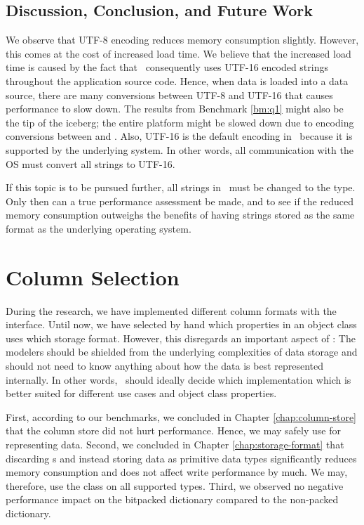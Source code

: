 \subsection{Discussion, Conclusion, and Future Work}
\label{sub:Discussion, Conclusion, and Future Work}
We observe that UTF-8 encoding reduces memory consumption slightly. However, this comes at the cost of increased load time. We believe that the increased load time is caused by the fact that \gap~consequently uses UTF-16 encoded strings throughout the application source code. Hence, when data is loaded into a data source, there are many conversions between UTF-8 and UTF-16 that causes performance to slow down. The results from Benchmark \ref{bm:q1} might also be the tip of the iceberg; the entire platform might be slowed down due to encoding conversions between  and . Also, UTF-16 is the default encoding in \delphi~because it is supported by the underlying system. In other words, all communication with the OS must convert all strings to UTF-16. 

If this topic is to be pursued further, all strings in \gap~must be changed to the  type. Only then can a true performance assessment be made, and to see if the reduced memory consumption outweighs the benefits of having strings stored as the same format as the underlying operating system.

\section{Column Selection}
\label{sec:Column Selection}
During the research, we have implemented different column formats with the  interface. Until now, we have selected by hand which properties in an object class uses which storage format. However, this disregards an important aspect of \mdd: The modelers should be shielded from the underlying complexities of data storage and should not need to know anything about how the data is best represented internally. In other words, \gap~should ideally decide which  implementation which is better suited for different use cases and object class properties.

First, according to our benchmarks, we concluded in Chapter \ref{chap:column-store} that the column store did not hurt performance. Hence, we may safely use  for representing data. Second, we concluded in Chapter \ref{chap:storage-format} that discarding s and instead storing data as primitive data types significantly reduces memory consumption and does not affect write performance by much. We may, therefore, use the  class on all supported types. Third, we observed no negative performance impact on the bitpacked dictionary compared to the non-packed dictionary. 

